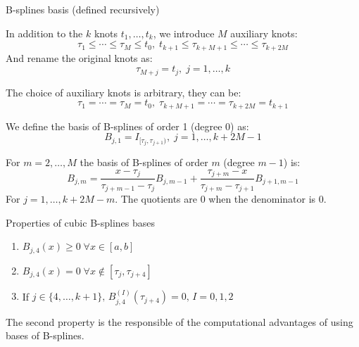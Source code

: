 \begin{definition}{B-splines basis}{} (defined recursively)

    In addition to the $k$ knots $t_1,\ldots,t_k$, we introduce $M$ auxiliary
    knots:
    \begin{equation*}
        \tau_1 \leq \cdots \leq \tau_M \leq t_0,\;
        t_{k+1} \leq \tau_{k+M+1} \leq \cdots \leq \tau_{k+2M}
    \end{equation*}
    And rename the original knots as:
    \begin{equation*}
        \tau_{M+j} = t_j,\; j=1,\ldots,k
    \end{equation*}

    The choice of auxiliary knots is arbitrary, they can be:
    \begin{equation*}
        \tau_1=\cdots=\tau_M = t_0,\; \tau_{k+M+1}=\cdots=\tau_{k+2M} = t_{k+1}
    \end{equation*}

    We define the basis of B-splines of order 1 (degree 0) as:
    \begin{equation*}
        B_{j,1} = I_{[\tau_j,\tau_{j+1})},\; j=1,\ldots,k+2M - 1
    \end{equation*}

    For $m=2,\ldots,M$ the basis of B-splines of order $m$ (degree $m-1$) is:
    \begin{equation*}
        B_{j,m} = \frac{x-\tau_j}{\tau_{j+m-1}-\tau_j}B_{j,m-1}
        + \frac{\tau_{j+m}-x}{\tau_{j+m}-\tau_{j+1}}B_{j+1,m-1}
    \end{equation*}
    For $j=1,\ldots,k+2M-m$. The quotients are 0 when the denominator is 0.
\end{definition}

\begin{example}{Properties of cubic B-splines bases}{}
    \begin{enumerate}
        \item $B_{j,4}(x) \geq 0\; \forall x \in [a,b]$
        \item $B_{j,4}(x) = 0\; \forall x \notin [\tau_j,\tau_{j+4}]$
        \item If $j \in \{4,\ldots,k+1\},\, B_{j,4}^{(I)}(\tau_{j+4}) = 0,\,I=0,1,2$
    \end{enumerate}
    The second property is the responsible of the computational advantages
    of using bases of B-splines.
\end{example}


